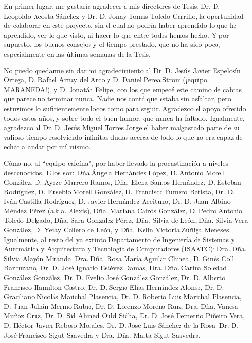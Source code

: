 \cleardoublepage
\thispagestyle{empty}

En primer lugar, me gustaría agradecer a mis directores de Tesis, Dr. D. Leopoldo Acosta Sánchez y Dr. D. Jonay Tomás Toledo Carrillo, la oportunidad de colaborar en este proyecto, sin el cual no podría haber aprendido lo que he aprendido, ver lo que visto, ni hacer lo que entre todos hemos hecho. Y por supuesto, los buenos consejos y el tiempo prestado, que no ha sido poco, especialmente en las últimas semanas de la Tesis.

No puedo quedarme sin dar mi agradecimiento al Dr. D. Jesús Javier Espelosín Ortega, D. Rafael Arnay del Arco y D. Daniel Perea Ström (¡equipo MARANEDA!), y D. Jonatán Felipe, con los que empecé este camino de cabras que parece no terminar nunca. Nadie nos contó que estaba sin asfaltar, pero estuvimos lo suficientemente locos como para seguir. Agradezco el apoyo ofrecido todos estos años, y sobre todo el buen humor, que nunca ha faltado. Igualmente, agradezco al Dr. D. Jesús Miguel Torres Jorge el haber malgastado parte de su valioso tiempo resolviendo infinitas dudas acerca de todo lo que no era capaz de echar a andar por mí mismo. 

Cómo no, al ``equipo cafeína'', por haber llevado la procastinación a niveles desconocidos. Ellos son: Dña Ángela Hernández López, D. Antonio Morell González, D. Ayoze Marrero Ramos, Dña. Elena Santos Hernández, D. Esteban Rodríguez, D. Eusebio Morell González, D. Francisco Fumero Batista, Dr. D. Iván Castilla Rodríguez, D. Javier Hernández Aceituno, Dr. D. Juan Albino Méndez Pérez (a.k.a. Alexis), Dña. Mariana Cairós González, D. Pedro Antonio Toledo Delgado, Dña. Sara González Pérez, Dña. Silvia de León, Dña. Silvia Vera González, D. Yeray Callero de León, y Dña. Kelin Victoria Zúñiga Meneses. Igualmente, al resto del ya extinto Departamento de Ingeniería de Sistemas y Automática y Arquitectura y Tecnología de Computadores (ISAATC): Dra. Dña. Silvia Alayón Miranda, Dra. Dña. Rosa María Aguilar Chinea, D. Ginés Coll Barbuzano, Dr. D. José Ignacio Estévez Damas, Dra. Dña. Carina Soledad González González, Dr. D. Evelio José González González, Dr. D. Alberto Francisco Hamilton Castro, Dr. D. Sergio Elías Hernández Alonso, Dr. D. Graciliano Nicolás Marichal Plasencia, Dr. D. Roberto Luis Marichal Plasencia, D. Juan Julián Merino Rubio, Dr. D. Lorenzo Moreno Ruiz, Dra. Dña. Vanesa Muñoz Cruz, Dr. D. Sid Ahmed Ould Sidha, Dr. D. José Demetrio Piñeiro Vera, D. Héctor Javier Reboso Morales, Dr. D. José Luis Sánchez de la Rosa, Dr. D. José Francisco Sigut Saavedra y Dra. Dña. Marta Sigut Saavedra.

